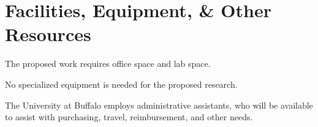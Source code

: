 \section*{\hfil Facilities, Equipment, \& Other Resources \hfil}
\vspace{-16pt}
\noindent\hrulefill



\noindent The proposed work requires office space and lab space.


\bigskip
{}

\noindent No specialized equipment is needed for the proposed research.

\bigskip
{}

\noindent The University at Buffalo employs administrative assistants, who will be available to assist with purchasing, travel, reimbursement, and other needs. 